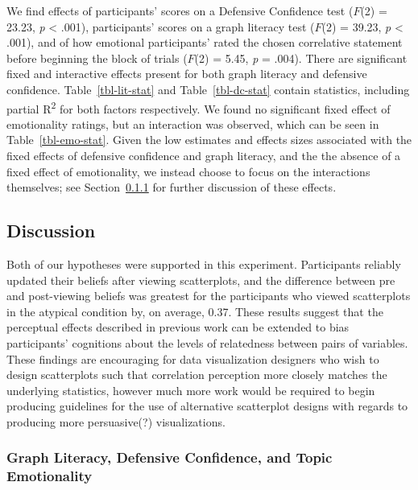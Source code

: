 \documentclass[manuscript,screen,review]{acmart}
\begin{document}
We find effects of participants' scores on a Defensive Confidence test
(\(F\)(2) = 23.23, \emph{p} \textless{} .001), participants' scores on a
graph literacy test \citep{garcia_2016} (\(F\)(2) = 39.23, \emph{p}
\textless{} .001), and of how emotional participants' rated the chosen
correlative statement before beginning the block of trials (\(F\)(2) =
5.45, \emph{p} = .004). There are significant fixed and interactive
effects present for both graph literacy and defensive confidence.
Table~\ref{tbl-lit-stat} and Table~\ref{tbl-dc-stat} contain statistics,
including partial R\textsuperscript{2} for both factors respectively. We
found no significant fixed effect of emotionality ratings, but an
interaction was observed, which can be seen in Table~\ref{tbl-emo-stat}.
Given the low estimates and effects sizes associated with the fixed
effects of defensive confidence and graph literacy, and the the absence
of a fixed effect of emotionality, we instead choose to focus on the
interactions themselves; see Section~\ref{sec-add-analyses-discussion}
for further discussion of these effects.

\subsection{Discussion}\label{sec-main-discussion}

Both of our hypotheses were supported in this experiment. Participants
reliably updated their beliefs after viewing scatterplots, and the
difference between pre and post-viewing beliefs was greatest for the
participants who viewed scatterplots in the atypical condition by, on
average, 0.37. These results suggest that the perceptual effects
described in previous work can be extended to bias participants'
cognitions about the levels of relatedness between pairs of variables.
These findings are encouraging for data visualization designers who wish
to design scatterplots such that correlation perception more closely
matches the underlying statistics, however much more work would be
required to begin producing guidelines for the use of alternative
scatterplot designs with regards to producing more persuasive(?)
visualizations.

\subsubsection{Graph Literacy, Defensive Confidence, and Topic
Emotionality}\label{sec-add-analyses-discussion}
\end{document}
